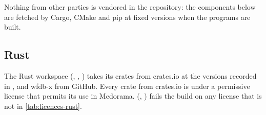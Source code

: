 Nothing from other parties is vendored in the repository: the components below are fetched by
Cargo, CMake and pip at fixed versions when the programs are built.

\subsection{Rust}
\label{sec:licences-rust}

The Rust workspace (, , ) takes its crates from
crates.io at the versions recorded in , and wfdb-x from GitHub. Every crate from
crates.io is under a permissive license that permits its use in Medorama. 
(, ) fails the build on any license that is not in
\cref{tab:licences-rust}.


